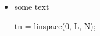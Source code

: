 \begin{itemize}
\item some text
\begin{MatlabCode}
tn = linspace(0, L, N);
\end{MatlabCode}
\end{itemize}
